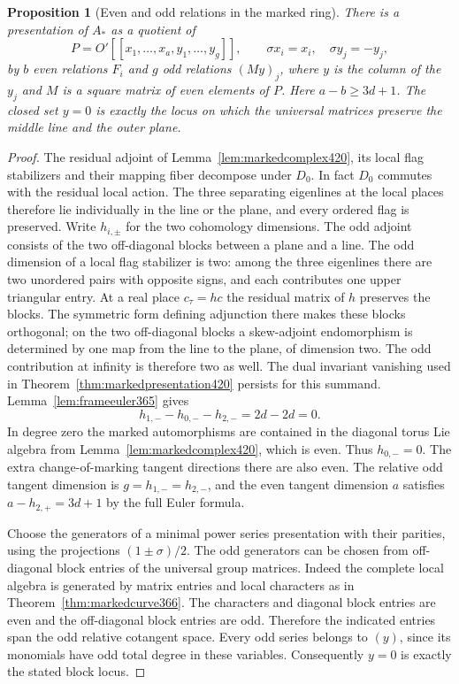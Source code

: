 \documentclass[a4paper,11pt]{article}
\newtheorem{proposition}{Proposition}[section]
\theoremstyle{definition}
\theoremstyle{remark}
\numberwithin{equation}{section}
\begin{document}
\begin{proposition}[Even and odd relations in the marked ring]\leavevmode
\label{prop:paritypresentation422}
There is a presentation of \(A_*\) as a quotient of
\[
 P=O'[[x_1,\ldots,x_a,y_1,\ldots,y_g]],\qquad
                   \sigma x_i=x_i,\quad \sigma y_j=-y_j ,
\]
by \(b\) even relations \(F_i\) and \(g\) odd relations
\((My)_j\), where \(y\) is the column of the \(y_j\) and
\(M\) is a square matrix of even elements of \(P\).
Here \(a-b\ge3d+1\). The closed set \(y=0\) is exactly the
locus on which the universal matrices preserve the middle
line and the outer plane.
\end{proposition}
\begin{proof}
The residual adjoint of Lemma~\ref{lem:markedcomplex420},
its local flag stabilizers and their mapping fiber decompose
under \(D_0\). In fact \(D_0\) commutes with the residual
local action. The three separating eigenlines at the local
places therefore lie individually in the line or the plane,
and every ordered flag is preserved. Write \(h_{i,\pm}\)
for the two cohomology dimensions. The odd adjoint consists
of the two off-diagonal blocks between a plane and a line.
The odd dimension of a local flag stabilizer is two: among
the three eigenlines there are two unordered pairs with
opposite signs, and each contributes one upper triangular
entry. At a real place \(c_\tau=h c\) the residual matrix
of \(h\) preserves the blocks. The symmetric form defining
adjunction there makes these blocks orthogonal; on the two
off-diagonal blocks a skew-adjoint endomorphism is determined
by one map from the line to the plane, of dimension two.
The odd contribution at infinity is therefore two as well.
The dual invariant vanishing used in
Theorem~\ref{thm:markedpresentation420} persists for this
summand. Lemma~\ref{lem:frameeuler365} gives
\[
             h_{1,-}-h_{0,-}-h_{2,-}=2d-2d=0 .
\]
In degree zero the marked automorphisms are contained in the
diagonal torus Lie algebra from Lemma~\ref{lem:markedcomplex420},
which is even. Thus \(h_{0,-}=0\). The extra change-of-marking
tangent directions there are also even. The relative odd tangent
dimension is \(g=h_{1,-}=h_{2,-}\), and the even tangent
dimension \(a\) satisfies \(a-h_{2,+}=3d+1\) by the full Euler
formula.

Choose the generators of a minimal power series presentation
with their parities, using the projections \((1\pm\sigma)/2\).
The odd generators can be chosen from off-diagonal block entries
of the universal group matrices. Indeed the complete local
algebra is generated by matrix entries and local characters
as in Theorem~\ref{thm:markedcurve366}. The characters and
diagonal block entries are even and the off-diagonal block
entries are odd. Therefore the indicated entries span the odd
relative cotangent space. Every odd series belongs to \((y)\),
since its monomials have odd total degree in these variables.
Consequently \(y=0\) is exactly the stated block locus.


\end{proof}
\end{document}
